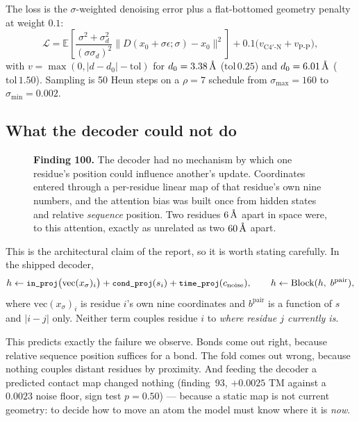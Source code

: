 \documentclass[11pt,a4paper]{article}
\begin{document}
The loss is the $\sigma$-weighted denoising error plus a flat-bottomed
geometry penalty at weight $0.1$:
\begin{equation}
\mathcal{L} = \mathbb{E}\!\left[\frac{\sigma^2+\sigma_d^2}{(\sigma\sigma_d)^2}
  \lVert D(x_0+\sigma\epsilon;\sigma) - x_0 \rVert^2\right]
  + 0.1\big(v_{\text{C4}'\text{-N}} + v_{\text{P-P}}\big),
\end{equation}
with $v = \max(0, |d - d_0| - \mathrm{tol})$ for
$d_0 = 3.38\,\text{\AA}$ ($\mathrm{tol}\,0.25$) and
$d_0 = 6.01\,\text{\AA}$ ($\mathrm{tol}\,1.50$). Sampling is 50 Heun steps on a
$\rho=7$ schedule from $\sigma_{\max}=160$ to $\sigma_{\min}=0.002$.

\subsection{What the decoder could not do}

\begin{figure}[H]\centering
\resizebox{\textwidth}{!}{}
\caption{\textbf{Finding 100.} The decoder had no mechanism by which one
residue's position could influence another's update. Coordinates entered
through a per-residue linear map of that residue's own nine numbers, and
the attention bias was built once from hidden states and relative
\emph{sequence} position. Two residues $6\,\text{\AA}$ apart in space were, to
this attention, exactly as unrelated as two $60\,\text{\AA}$ apart.}
\label{fig:decoder}
\end{figure}

This is the architectural claim of the report, so it is worth stating
carefully. In the shipped decoder,
\begin{equation}
h \leftarrow \texttt{\small in\_proj}\big(\mathrm{vec}(x_\sigma)_i\big)
  + \texttt{\small cond\_proj}(s_i) + \texttt{\small time\_proj}(c_{\text{noise}}),
\qquad
h \leftarrow \mathrm{Block}(h,\; b^{\text{pair}}),
\end{equation}
where $\mathrm{vec}(x_\sigma)_i$ is residue $i$'s own nine coordinates and
$b^{\text{pair}}$ is a function of $s$ and $|i-j|$ only. Neither term
couples residue $i$ to \emph{where residue $j$ currently is}.

This predicts exactly the failure we observe. Bonds come out right,
because relative sequence position suffices for a bond. The fold comes
out wrong, because nothing couples distant residues by proximity. And
feeding the decoder a predicted contact map changed nothing
(finding~93, $+0.0025$ TM against a $0.0023$ noise floor, sign test
$p = 0.50$) --- because a static map is not current geometry: to decide
how to move an atom the model must know where it is \emph{now}.
\end{document}
